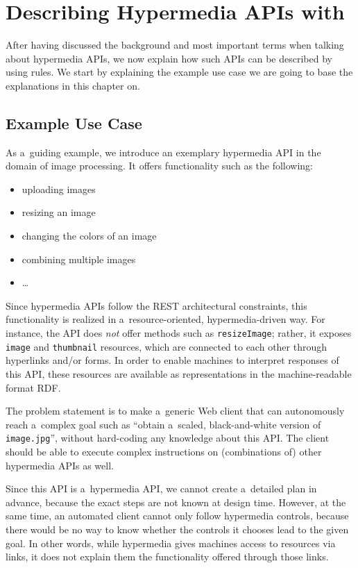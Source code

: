 \section{Describing Hypermedia APIs with \restdesc}
\label{sec:RESTdesc}
After having discussed the background and most important terms when talking about hypermedia APIs, we now explain how such APIs can be described by using \nthree rules. We start by explaining the example 
use case we are going to base the explanations in this chapter on.

\subsection{Example Use Case}\label{usecase}
As a~guiding example, we introduce an exemplary hypermedia API
in the domain of image processing.
It offers functionality such as the following:
\begin{itemize}
  \item uploading images
  \item resizing an image
  \item changing the colors of an image
  \item combining multiple images
  \item \ldots
\end{itemize}
Since hypermedia APIs follow the REST architectural constraints,
this functionality is realized in a~resource-oriented, hypermedia-driven way.
For instance, the API does \emph{not} offer methods such as \verb!resizeImage!;
rather, it exposes \verb!image! and \verb!thumbnail! resources,
which are connected to each other through hyperlinks and/or forms.
In order to enable machines to interpret responses of this API,
these resources are available as representations in the machine-readable format RDF.

The problem statement is to make a~generic Web client
that can autonomously reach a~complex goal such as
``obtain a~scaled, black-and-white version of \verb!image.jpg!'',
without hard-coding any knowledge about this API.
The client should be able to execute complex instructions
on (combinations of) other hypermedia APIs as well.

Since this API is a~hypermedia API,
we cannot create a~detailed plan in advance,
because the exact steps are not known at design time.
However, at the same time,
an automated client cannot only follow hypermedia controls,
because there would be no way to know
whether the controls it chooses lead to the given goal.
In other words,
while hypermedia gives machines access to resources via links,
it does not explain them the functionality offered through those links.

